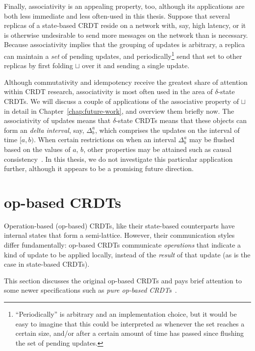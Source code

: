Finally, associativity is an appealing property, too, although its applications
are both less immediate and less often-used in this thesis. Suppose that several
replicas of a state-based CRDT reside on a network with, say, high latency, or
it is otherwise undesirable to send more messages on the network than is
necessary. Because associativity implies that the grouping of updates is
arbitrary, a replica can maintain a \textit{set} of pending updates, and
periodically\footnote{``Periodically'' is arbitrary and an implementation
choice, but it would be easy to imagine that this could be interpreted as
whenever the set reaches a certain size, and/or after a certain amount of time
has passed since flushing the set of pending updates.} send that set to other
replicas by first folding $\sqcup$ over it and sending a single update.

Although commutativity and idempotency receive the greatest share of attention
within CRDT research, associativity is most often used in the area of
$\delta$-state CRDTs. We will discuss a couple of applications of the
associative property of $\sqcup$ in detail in Chapter~\ref{chap:future-work},
and overview them briefly now. The associativity of updates means that
$\delta$-state CRDTs means that these objects can form an \emph{delta interval},
say, $\Delta^a_b$, which comprises the updates on the interval of time $[a,b)$.
When certain restrictions on when an interval $\Delta^a_b$ may be flushed based
on the values of $a$, $b$, other properties may be attained such as causal
consistency~\citep{almedia18}. In this thesis, we do not investigate this
particular application further, although it appears to be a promising future
direction.

\section{op-based CRDTs}
\label{sec:op-based-crdts}

Operation-based (op-based) CRDTs, like their state-based counterparts have
internal states that form a semi-lattice. However, their communication styles
differ fundamentally: op-based CRDTs communicate \textit{operations} that
indicate a kind of update to be applied locally, instead of the \textit{result}
of that update (as is the case in state-based CRDTs).

This section discusses the original op-based CRDTs and pays brief attention to
some newer specifications such as \textit{pure op-based CRDTs}~\citep{shapiro11,
baquero17}.

